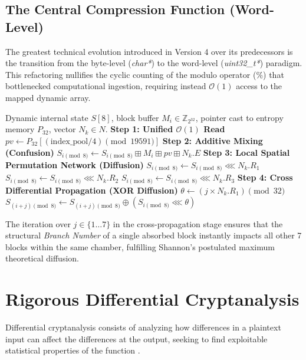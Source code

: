 \documentclass[10pt,journal,compsoc]{IEEEtran}
\begin{document}
\subsection{The Central Compression Function (Word-Level)}
The greatest technical evolution introduced in Version 4 over its predecessors is the transition from the byte-level (\textit{char*}) to the word-level (\textit{uint32\_t*}) paradigm. This refactoring nullifies the cyclic counting of the modulo operator ($\%$) that bottlenecked computational ingestion, requiring instead $\mathcal{O}(1)$ access to the mapped dynamic array.

\begin{algorithm}
\caption{C-Native Word-Level ARX Compression Core}
\begin{algorithmic}[1]
\REQUIRE Dynamic internal state $S[8]$, block buffer $M_i \in \mathbb{Z}_{2^{32}}$, pointer cast to entropy memory $P_{32}$, vector $N_k \in N$.
    \STATE \textbf{Step 1: Unified $\mathcal{O}(1)$ Read}
    \STATE $pv \leftarrow P_{32}[(\text{index\_pool} / 4) \pmod{19591}]$
    \STATE \textbf{Step 2: Additive Mixing (Confusion)}
    \STATE $S_{i \pmod{8}} \leftarrow S_{i \pmod{8}} \boxplus M_i \boxplus pv \boxplus N_{k}.E$
    \STATE \textbf{Step 3: Local Spatial Permutation Network (Diffusion)}
    \STATE $S_{i \pmod{8}} \leftarrow S_{i \pmod{8}} \lll N_{k}.R_1$
    \STATE $S_{i \pmod{8}} \leftarrow S_{i \pmod{8}} \lll N_{k}.R_2$
    \STATE $S_{i \pmod{8}} \leftarrow S_{i \pmod{8}} \lll N_{k}.R_3$
    \STATE \textbf{Step 4: Cross Differential Propagation (XOR Diffusion)}
        \STATE $\theta \leftarrow (j \times N_{k}.R_1) \pmod{32}$
        \STATE $S_{(i+j)\pmod{8}} \leftarrow S_{(i+j)\pmod{8}} \oplus \left( S_{i \pmod{8}} \lll \theta \right)$
    \ENDFOR
\ENDFOR
\end{algorithmic}
\end{algorithm}

The iteration over $j \in \{1 \dots 7\}$ in the cross-propagation stage ensures that the structural \textit{Branch Number} of a single absorbed block instantly impacts all other 7 blocks within the same chamber, fulfilling Shannon's postulated maximum theoretical diffusion.

\section{Rigorous Differential Cryptanalysis}

Differential cryptanalysis consists of analyzing how differences in a plaintext input can affect the differences at the output, seeking to find exploitable statistical properties of the function \cite{biham1991differential}.
\end{document}
